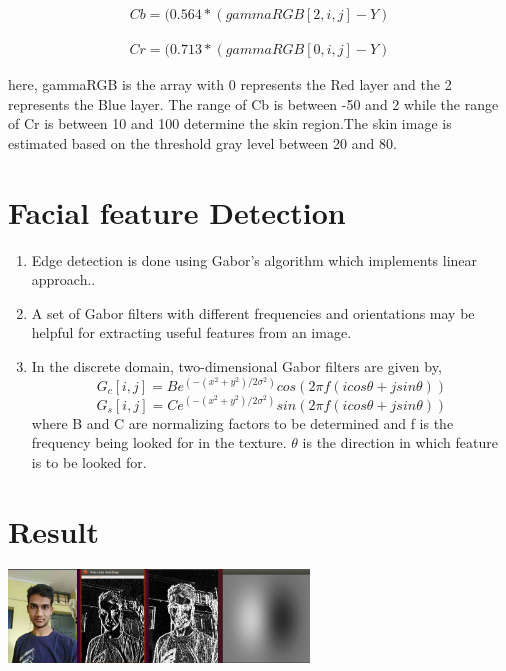 \documentclass[journal]{IEEEtran}
\begin{document}
	\begin{equation}
	\begin{split}
	Cb=(0.564*(gammaRGB[2,i,j]-Y)
	\end{split}
	\end{equation}
	
	
	\begin{equation}
	\begin{split}
	Cr=(0.713*(gammaRGB[0,i,j]-Y)
	\end{split}
	\end{equation}
	
	 here, gammaRGB is the array with 0 represents the Red
	layer and the 2 represents the Blue layer. The range of Cb
	is between -50 and 2 while the range of Cr is between 10
	and 100 determine the skin region.The skin image is estimated based on the threshold
	gray level between 20 and 80.
	
	\section{\textbf{Facial feature Detection}}
	\begin{enumerate}
	    \item Edge detection is done using Gabor's algorithm which implements linear approach..
	    \item A set of Gabor filters with different frequencies and orientations may be helpful for extracting useful features from an image.
	    \item In the discrete domain, two-dimensional Gabor filters are given by,\\
	    \begin{equation}
	        G_c[i, j] = Be^{(-(x^2+y^2)/2\sigma^2)}cos(2\pi f(icos\theta + jsin\theta))
	    \end{equation}
	    \begin{equation}
	        G_s[i, j] = Ce^{(-(x^2+y^2)/2\sigma^2)}sin(2\pi f(icos\theta + jsin\theta))
	    \end{equation}
	    where B and C are normalizing factors to be determined and f is the frequency being looked for in the texture. $\theta$ is the direction in which feature is to be looked for.
	\end{enumerate}
	
\newpage
\section{\textbf{Result}}
    \begin{minipage}{\linewidth}
		\centering
		\includegraphics[width = 80mm]{gabor_crop.png}
	\end{minipage} 
	
\end{document}
